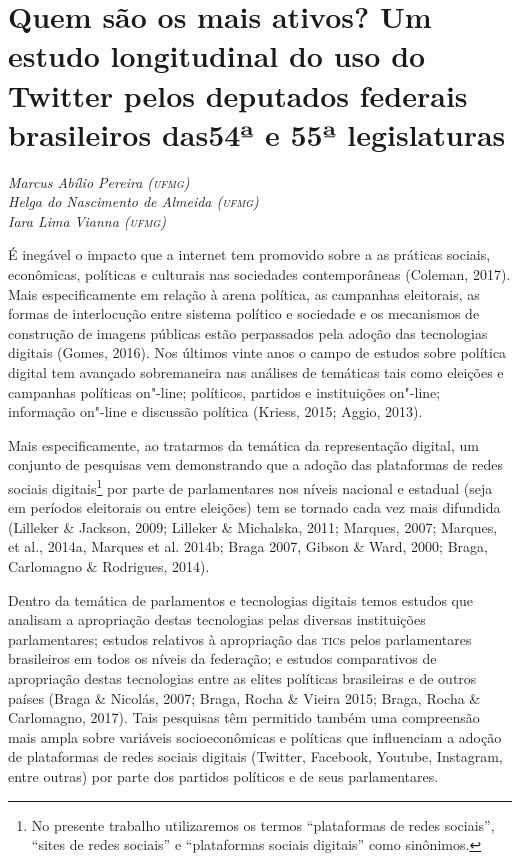 \chapter*{Quem são os mais ativos? Um estudo longitudinal do uso do
Twitter pelos deputados federais brasileiros das\break 54ª e 55ª legislaturas}

\begin{flushright}
\emph{Marcus Abílio Pereira (\textsc{ufmg})\\Helga do Nascimento de Almeida (\textsc{ufmg})\\Iara Lima Vianna (\textsc{ufmg})}
\end{flushright}

É inegável o impacto que a internet tem promovido sobre a as práticas
sociais, econômicas, políticas e culturais nas sociedades contemporâneas
(Coleman, 2017). Mais especificamente em relação à arena política, as
campanhas eleitorais, as formas de interlocução entre sistema político e
sociedade e os mecanismos de construção de imagens públicas estão
perpassados pela adoção das tecnologias digitais (Gomes, 2016). Nos
últimos vinte anos o campo de estudos sobre política digital tem
avançado sobremaneira nas análises de temáticas tais como eleições e
campanhas políticas on"-line; políticos, partidos e instituições on"-line;
informação on"-line e discussão política (Kriess, 2015; Aggio, 2013).

Mais especificamente, ao tratarmos da temática da representação digital,
um conjunto de pesquisas vem demonstrando que a adoção das plataformas
de redes sociais digitais\footnote{No presente trabalho utilizaremos os
  termos ``plataformas de redes sociais'', ``sites de redes sociais'' e
  ``plataformas sociais digitais'' como sinônimos.} por parte de
parlamentares nos níveis nacional e estadual (seja em períodos
eleitorais ou entre eleições) tem se tornado cada vez mais difundida
(Lilleker \& Jackson, 2009; Lilleker \& Michalska, 2011; Marques, 2007;
Marques, et al., 2014a, Marques et al. 2014b; Braga 2007, Gibson \&
Ward, 2000; Braga, Carlomagno \& Rodrigues, 2014).

Dentro da temática de parlamentos e tecnologias digitais temos estudos
que analisam a apropriação destas tecnologias pelas diversas
instituições parlamentares; estudos relativos à apropriação das \textsc{tic}s
pelos parlamentares brasileiros em todos os níveis da federação; e
estudos comparativos de apropriação destas tecnologias entre as elites
políticas brasileiras e de outros países (Braga \& Nicolás, 2007; Braga,
Rocha \& Vieira 2015; Braga, Rocha \& Carlomagno, 2017). Tais pesquisas
têm permitido também uma compreensão mais ampla sobre variáveis
socioeconômicas e políticas que influenciam a adoção de plataformas de
redes sociais digitais (Twitter, Facebook, Youtube, Instagram, entre
outras) por parte dos partidos políticos e de seus parlamentares.

